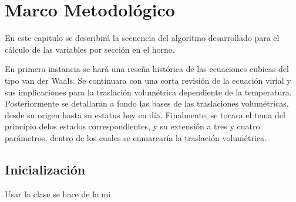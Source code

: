 \chapter{Marco Metodológico}

\par En este capitulo se describirá la secuencia del algoritmo desarrollado para el cálculo de las variables por sección en el horno. 

En primera instancia se hará una reseña histórica de las ecuaciones cubicas del tipo van der Waals. 
Se continuara con una corta revisión de la ecuación virial y sus implicaciones para la traslación volumétrica dependiente de la temperatura. 
Posteriormente se detallaran a fondo las bases de las traslaciones volumétricas, desde su origen hasta su estatus hoy en día. Finalmente, se tocara el tema del principio delos estados correspondientes, y su extensión a tres y cuatro parámetros, dentro de los cuales se enmarcaría la traslación volumétrica.

\section{Inicialización}

\par Usar la clase se hace de la mi